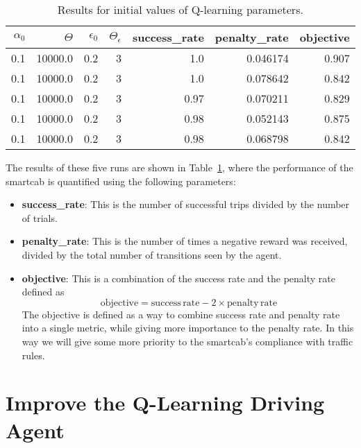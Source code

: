 \documentclass[conference]{IEEEtran}
\begin{document}
\begin{table}
\scriptsize
\begin{tabular}{rrrrrrr}
\hline
$\alpha_0$ &    $\Theta$ &  $\epsilon_0$ &  $\Theta_\epsilon$ &  success\_rate &  penalty\_rate &  objective \\
\hline
0.1 &  10000.0 &        0.2 &                  3 &           1.0 &      0.046174 &   0.907 \\
0.1 &  10000.0 &        0.2 &                  3 &           1.0 &      0.078642 &   0.842 \\
0.1 &  10000.0 &        0.2 &                  3 &          0.97 &      0.070211 &   0.829 \\
0.1 &  10000.0 &        0.2 &                  3 &          0.98 &      0.052143 &   0.875 \\
0.1 &  10000.0 &        0.2 &                  3 &          0.98 &      0.068798 &   0.842 \\
\hline
\end{tabular}
    \vspace{1em}
\caption{Results for initial values of Q-learning parameters.}
    \label{tab:00}
\end{table}

The results of these five runs 
are shown in Table~\ref{tab:00}, where the performance of the smartcab is
quantified using the following parameters:
\begin{itemize}
\item \textbf{success\_rate}: This is the number of successful trips divided
    by the number of trials.
\item \textbf{penalty\_rate}: This is the number of times a negative reward was
    received, divided by the total number of transitions seen by the agent.
\item \textbf{objective}:  This is a combination of the success rate and the
    penalty rate defined as
\begin{equation}
    \mathrm{objective} = \mathrm{success\,rate} - 2\times\mathrm{penalty\,rate}
\end{equation}
  The objective is defined as a way to combine success rate and penalty rate
        into a single metric, while giving more importance to the penalty rate.
        In this way we will give some more priority to the smartcab's
        compliance with traffic rules.
\end{itemize}

\section{Improve the Q-Learning Driving Agent}
\end{document}
